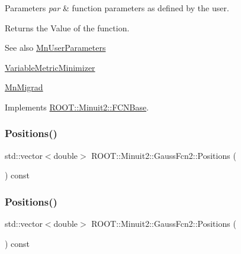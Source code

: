 \begin{DoxyParams}{Parameters}
{\em par} & function parameters as defined by the user.\\
\hline
\end{DoxyParams}
\begin{DoxyReturn}{Returns}
the Value of the function.
\end{DoxyReturn}
\begin{DoxySeeAlso}{See also}
\mbox{\hyperlink{classROOT_1_1Minuit2_1_1MnUserParameters}{Mn\+User\+Parameters}} 

\mbox{\hyperlink{classROOT_1_1Minuit2_1_1VariableMetricMinimizer}{Variable\+Metric\+Minimizer}} 

\mbox{\hyperlink{classROOT_1_1Minuit2_1_1MnMigrad}{Mn\+Migrad}} 
\end{DoxySeeAlso}


Implements \mbox{\hyperlink{classROOT_1_1Minuit2_1_1FCNBase_ae4a86bd94d0d0f5ca6fc8f8ab2bb43cd}{R\+O\+O\+T\+::\+Minuit2\+::\+F\+C\+N\+Base}}.

\mbox{\label{classROOT_1_1Minuit2_1_1GaussFcn2_a11faaa08de303ea203403c320c9e1f0a}} 
\subsubsection{\texorpdfstring{Positions()}{Positions()}\hspace{0.1cm}{\footnotesize\ttfamily [1/2]}}
{\footnotesize\ttfamily std\+::vector$<$double$>$ R\+O\+O\+T\+::\+Minuit2\+::\+Gauss\+Fcn2\+::\+Positions (\begin{DoxyParamCaption}{ }\end{DoxyParamCaption}) const\hspace{0.3cm}{\ttfamily [inline]}}

\mbox{\label{classROOT_1_1Minuit2_1_1GaussFcn2_a11faaa08de303ea203403c320c9e1f0a}} 
\subsubsection{\texorpdfstring{Positions()}{Positions()}\hspace{0.1cm}{\footnotesize\ttfamily [2/2]}}
{\footnotesize\ttfamily std\+::vector$<$double$>$ R\+O\+O\+T\+::\+Minuit2\+::\+Gauss\+Fcn2\+::\+Positions (\begin{DoxyParamCaption}{ }\end{DoxyParamCaption}) const\hspace{0.3cm}{\ttfamily [inline]}}


